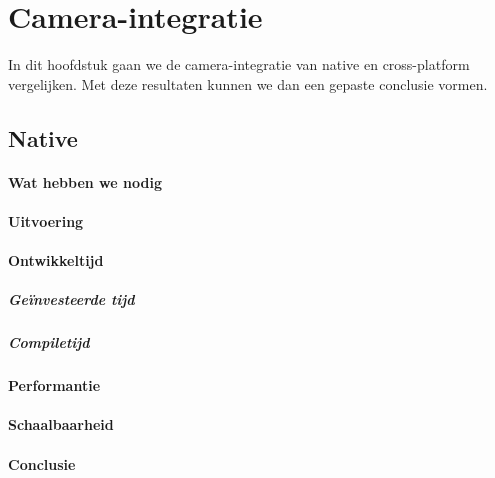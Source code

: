 
\chapter{Camera-integratie}%
\label{ch:camera}

In dit hoofdstuk gaan we de camera-integratie van native en cross-platform vergelijken. Met deze resultaten kunnen we dan een gepaste conclusie vormen.

\section{Native}
\subsubsection{Wat hebben we nodig}

\subsubsection{Uitvoering}

\subsubsection{Ontwikkeltijd}

\paragraph{Geïnvesteerde tijd}

\paragraph{Compiletijd}

\subsubsection{Performantie}

\subsubsection{Schaalbaarheid}

\subsubsection{Conclusie}



